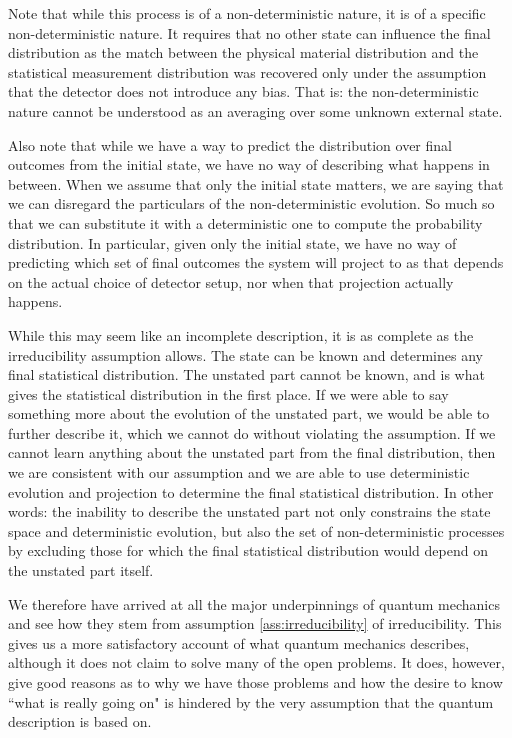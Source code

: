 \documentclass[smallextended]{svjour3}
\numberwithin{equation}{section}
\theoremstyle{definition}
\begin{document}
Note that while this process is of a non-deterministic nature, it is of a specific non-deterministic nature. It requires that no other state can influence the final distribution as the match between the physical material distribution and the statistical measurement distribution was recovered only under the assumption that the detector does not introduce any bias. That is: the non-deterministic nature cannot be understood as an averaging over some unknown external state.

Also note that while we have a way to predict the distribution over final outcomes from the initial state, we have no way of describing what happens in between. When we assume that only the initial state matters, we are saying that we can disregard the particulars of the non-deterministic evolution. So much so that we can substitute it with a deterministic one to compute the probability distribution. In particular, given only the initial state, we have no way of predicting which set of final outcomes the system will project to as that depends on the actual choice of detector setup, nor when that projection actually happens.

While this may seem like an incomplete description, it is as complete as the irreducibility assumption allows. The state can be known and determines any final statistical distribution. The unstated part cannot be known, and is what gives the statistical distribution in the first place. If we were able to say something more about the evolution of the unstated part, we would be able to further describe it, which we cannot do without violating the assumption. If we cannot learn anything about the unstated part from the final distribution, then we are consistent with our assumption and we are able to use deterministic evolution and projection to determine the final statistical distribution. In other words: the inability to describe the unstated part not only constrains the state space and deterministic evolution, but also the set of non-deterministic processes by excluding those for which the final statistical distribution would depend on the unstated part itself.

We therefore have arrived at all the major underpinnings of quantum mechanics and see how they stem from assumption \ref{ass:irreducibility} of irreducibility. This gives us a more satisfactory account of what quantum mechanics describes, although it does not claim to solve many of the open problems. It does, however, give good reasons as to why we have those problems and how the desire to know ``what is really going on" is hindered by the very assumption that the quantum description is based on.
\end{document}
